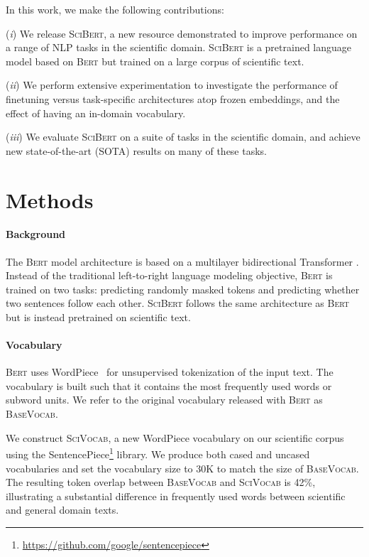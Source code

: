 \documentclass[11pt,a4paper]{article}
\newcommand{\bert}{\textsc{Bert}\xspace}
\newcommand{\scibert}{\textsc{SciBert}\xspace}
\newcommand{\basevocab}{\textsc{BaseVocab}\xspace}
\newcommand{\scivocab}{\textsc{SciVocab}\xspace}
\begin{document}
In this work, we make the following contributions:

\indent (\textit{i}) We release \scibert, a new resource demonstrated to improve performance on a range of NLP tasks in the scientific domain. \scibert is a pretrained language model based on \bert but trained on a large corpus of scientific text.

\indent (\textit{ii}) We perform extensive experimentation to investigate the performance of finetuning versus task-specific architectures atop frozen embeddings, and the effect of having an in-domain vocabulary.

\indent (\textit{iii}) We evaluate \scibert on a suite of tasks in the scientific domain, and achieve new state-of-the-art (SOTA) results on many of these tasks.








 
\section{Methods}

\paragraph{Background} The \bert model architecture \cite{Devlin2018BERTPO} is based on a multilayer bidirectional Transformer \cite{Vaswani2017AttentionIA}. Instead of the traditional left-to-right language modeling objective, \bert is trained on two tasks: predicting randomly masked tokens and predicting whether two sentences follow each other. \scibert follows the same architecture as \bert but is instead pretrained on scientific text.


\paragraph{Vocabulary}
\label{sec:vocab}
\bert uses WordPiece~\cite{ Wu2016GooglesNM} for unsupervised tokenization
of the input text. 
The vocabulary is built such that it contains
the most frequently used words or subword units.  We refer to the original vocabulary released with \bert as \basevocab.

We construct \scivocab, a new WordPiece vocabulary on our scientific corpus using the SentencePiece\footnote{\url{https://github.com/google/sentencepiece}}
library.  
We produce both cased and uncased vocabularies and set the vocabulary size to 30K to match the size of \basevocab. The resulting token overlap between \basevocab and \scivocab is 42\%, illustrating a substantial difference in frequently used words between scientific and general domain texts.
\end{document}
